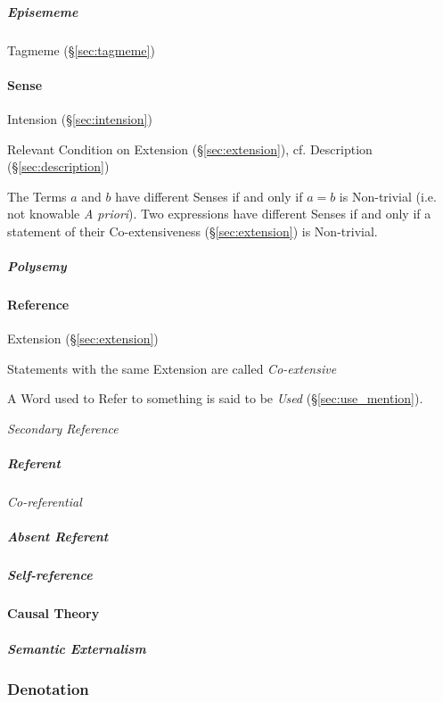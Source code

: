 \subparagraph{Episememe}\label{sec:episememe}\hfill

Tagmeme (\S\ref{sec:tagmeme})



\paragraph{Sense}\label{sec:sense}\hfill
\cite{chalmers02}

Intension (\S\ref{sec:intension})

Relevant Condition on Extension (\S\ref{sec:extension}), cf.
Description (\S\ref{sec:description})

The Terms $a$ and $b$ have different Senses if and only if $a = b$ is
Non-trivial (i.e. not knowable \emph{A priori}). Two expressions have
different Senses if and only if a statement of their Co-extensiveness
(\S\ref{sec:extension}) is Non-trivial.

\subparagraph{Polysemy}\label{sec:polysemy}\hfill



\paragraph{Reference}\label{sec:reference}\hfill

Extension (\S\ref{sec:extension})

Statements with the same Extension are called \emph{Co-extensive}

A Word used to Refer to something is said to be \emph{Used}
(\S\ref{sec:use_mention}).

\emph{Secondary Reference}

\subparagraph{Referent}\label{sec:referent}\hfill

\emph{Co-referential}

\subparagraph{Absent Referent}\label{sec:absent_referent}\hfill

\subparagraph{Self-reference}\label{sec:self_reference}\hfill



\paragraph{Causal Theory}\label{sec:causal_reference}\hfill

\subparagraph{Semantic Externalism}\label{sec:semantic_externalism}\hfill



\subsubsection{Denotation}\label{sec:denotation}

